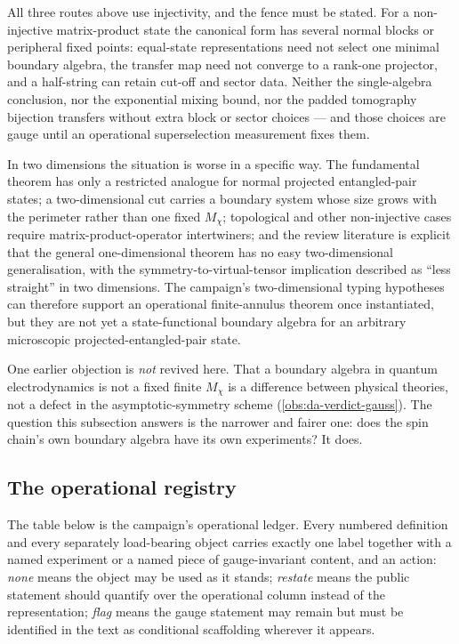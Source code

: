 All three routes above use injectivity, and the fence must be stated. For a
non-injective matrix-product state the canonical form has several normal blocks
or peripheral fixed points: equal-state representations need not select one
minimal boundary algebra, the transfer map need not converge to a rank-one
projector, and a half-string can retain cut-off and sector data. Neither the
single-algebra conclusion, nor the exponential mixing bound, nor the padded
tomography bijection transfers without extra block or sector choices --- and
those choices are gauge until an operational superselection measurement fixes
them.

In two dimensions the situation is worse in a specific way. The fundamental
theorem has only a restricted analogue for normal projected entangled-pair
states; a two-dimensional cut carries a boundary system whose size grows with
the perimeter rather than one fixed $M_\chi$; topological and other
non-injective cases require matrix-product-operator intertwiners; and the
review literature is explicit that the general one-dimensional theorem has no
easy two-dimensional generalisation, with the symmetry-to-virtual-tensor
implication described as ``less straight'' in two dimensions. The campaign's
two-dimensional typing hypotheses can therefore support an operational
finite-annulus theorem once instantiated, but they are not yet a
state-functional boundary algebra for an arbitrary microscopic
projected-entangled-pair state.

One earlier objection is \emph{not} revived here. That a boundary algebra in
quantum electrodynamics is not a fixed finite $M_\chi$ is a difference between
physical theories, not a defect in the asymptotic-symmetry scheme
(\cref{obs:da-verdict-gauss}). The question this subsection answers is the
narrower and fairer one: does the spin chain's own boundary algebra have its
own experiments? It does.


\subsection{The operational registry}
\label{sec:op-registry}

The table below is the campaign's operational ledger. Every numbered
definition and every separately load-bearing object carries exactly one label
together with a named experiment or a named piece of gauge-invariant content,
and an action: \emph{none} means the object may be used as it stands;
\emph{restate} means the public statement should quantify over the operational
column instead of the representation; \emph{flag} means the gauge statement may
remain but must be identified in the text as conditional scaffolding wherever
it appears.

